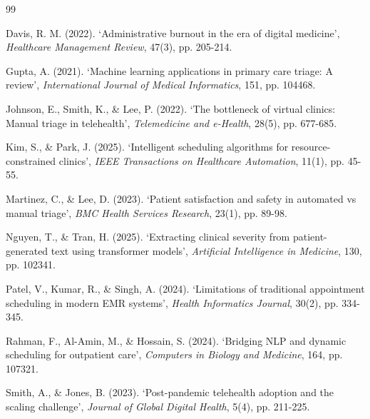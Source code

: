 \documentclass[12pt,a4paper]{report}
\begin{document}
\clearpage
{}
\begin{thebibliography}{99}

Davis, R. M. (2022). `Administrative burnout in the era of digital medicine', \textit{Healthcare Management Review}, 47(3), pp. 205-214.

Gupta, A. (2021). `Machine learning applications in primary care triage: A review', \textit{International Journal of Medical Informatics}, 151, pp. 104468.

Johnson, E., Smith, K., \& Lee, P. (2022). `The bottleneck of virtual clinics: Manual triage in telehealth', \textit{Telemedicine and e-Health}, 28(5), pp. 677-685.

Kim, S., \& Park, J. (2025). `Intelligent scheduling algorithms for resource-constrained clinics', \textit{IEEE Transactions on Healthcare Automation}, 11(1), pp. 45-55.

Martinez, C., \& Lee, D. (2023). `Patient satisfaction and safety in automated vs manual triage', \textit{BMC Health Services Research}, 23(1), pp. 89-98.

Nguyen, T., \& Tran, H. (2025). `Extracting clinical severity from patient-generated text using transformer models', \textit{Artificial Intelligence in Medicine}, 130, pp. 102341.

Patel, V., Kumar, R., \& Singh, A. (2024). `Limitations of traditional appointment scheduling in modern EMR systems', \textit{Health Informatics Journal}, 30(2), pp. 334-345.

Rahman, F., Al-Amin, M., \& Hossain, S. (2024). `Bridging NLP and dynamic scheduling for outpatient care', \textit{Computers in Biology and Medicine}, 164, pp. 107321.

Smith, A., \& Jones, B. (2023). `Post-pandemic telehealth adoption and the scaling challenge', \textit{Journal of Global Digital Health}, 5(4), pp. 211-225.

\end{thebibliography}
\end{document}

